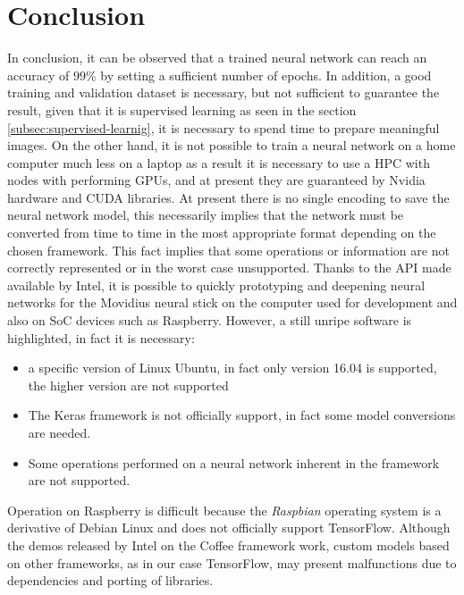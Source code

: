 \section{Conclusion}
\label{sec:conclusion}
In conclusion, it can be observed that a trained neural network can reach an 
accuracy of $99\%$ by setting a sufficient number of epochs. In addition, a 
good training and validation dataset is necessary, but not sufficient to 
guarantee the result, given that it is supervised learning as seen in the 
section \ref{subsec:supervised-learnig}, it is necessary to spend time to 
prepare meaningful images.
On the other hand, it is not possible to train a neural network on a home 
computer much less on a laptop as a result it is necessary to use a HPC with 
nodes with performing GPUs, and at present they are guaranteed by Nvidia 
hardware and CUDA libraries.
At present there is no single encoding to save the neural network model, this 
necessarily implies that the network must be converted from time to time in 
the most appropriate format depending on the chosen framework.
This fact implies that some operations or information are not correctly 
represented or in the worst case unsupported.
Thanks to the API made available by Intel, it is possible to quickly 
prototyping and deepening neural networks for the Movidius neural stick on the 
computer used for development and also on SoC devices such as Raspberry.
However, a still unripe software is highlighted, in fact it is necessary:
\begin{itemize}
\item a specific version of Linux Ubuntu, in fact only version 16.04 is 
supported, the higher version are not supported
\item The Keras framework is not officially support, in fact some model 
conversions are needed.
\item Some operations performed on a neural network inherent in the framework 
are not supported.
\end{itemize}
Operation on Raspberry is difficult because the \emph{Raspbian} operating system
is a derivative of Debian Linux and does not officially support TensorFlow.
Although the demos released by Intel on the Coffee framework work, custom 
models based on other frameworks, as in our case TensorFlow, may present 
malfunctions due to dependencies and porting of libraries.
